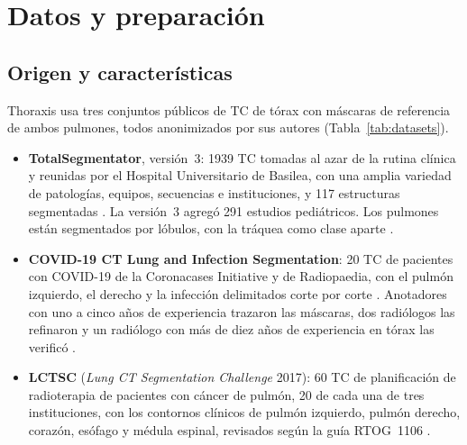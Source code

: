 %
%

\section{Datos y preparación}\label{sec:data}

\subsection{Origen y características}\label{sec:data-source}
Thoraxis usa tres conjuntos públicos de TC de tórax con máscaras de referencia
de ambos pulmones, todos anonimizados por sus autores
(Tabla~\ref{tab:datasets}).

\begin{itemize}
    \item \textbf{TotalSegmentator}, versión~3: 1939 TC tomadas al azar de la
          rutina clínica y reunidas por el Hospital Universitario de Basilea,
          con una amplia variedad de
          patologías, equipos, secuencias e instituciones, y 117 estructuras
          segmentadas \parencite{wasserthal2023dataset}. La versión~3 agregó
          291 estudios pediátricos. Los pulmones están segmentados por
          lóbulos, con la tráquea como clase aparte \parencite{wasserthal2023}.
    \item \textbf{COVID-19 CT Lung and Infection Segmentation}: 20 TC de
          pacientes con COVID-19 de la Coronacases Initiative y de
          Radiopaedia, con el pulmón izquierdo, el derecho y la infección
          delimitados corte por corte \parencite{ma2020}. Anotadores con uno a
          cinco años de experiencia trazaron las máscaras, dos radiólogos las
          refinaron y un radiólogo con más de diez años de experiencia en
          tórax las verificó \parencite{ma2021}.
    \item \textbf{LCTSC} (\textit{Lung CT Segmentation Challenge} 2017): 60
          TC de planificación de radioterapia de pacientes con cáncer de
          pulmón, 20 de cada una de tres instituciones, con los contornos
          clínicos de pulmón izquierdo, pulmón derecho, corazón, esófago y
          médula espinal, revisados según la guía RTOG~1106
          \parencite{yang2017, yang2018}.
\end{itemize}

